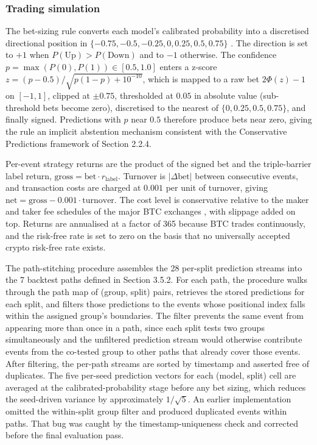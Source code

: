 \documentclass[12pt,a4paper,oneside]{article}
\begin{document}
\subsubsection{Trading simulation}\label{subsubsec:trading_simulation}

The bet-sizing rule converts each model's calibrated probability into a discretised directional position in $\{-0.75, -0.5, -0.25, 0, 0.25, 0.5, 0.75\}$ \citep[Chapter 10]{lopez_de_prado_2018}. The direction is set to $+1$ when $P(\text{Up}) > P(\text{Down})$ and to $-1$ otherwise. The confidence $p = \max(P(0), P(1)) \in [0.5, 1.0]$ enters a z-score $z = (p - 0.5) / \sqrt{p(1 - p) + 10^{-10}}$, which is mapped to a raw bet $2\Phi(z) - 1$ on $[-1, 1]$, clipped at $\pm 0.75$, thresholded at $0.05$ in absolute value (sub-threshold bets become zero), discretised to the nearest of $\{0, 0.25, 0.5, 0.75\}$, and finally signed. Predictions with $p$ near $0.5$ therefore produce bets near zero, giving the rule an implicit abstention mechanism consistent with the Conservative Predictions framework of Section 2.2.4.

Per-event strategy returns are the product of the signed bet and the triple-barrier label return, $\text{gross} = \text{bet} \cdot r_{\text{label}}$. Turnover is $|\Delta \text{bet}|$ between consecutive events, and transaction costs are charged at $0.001$ per unit of turnover, giving $\text{net} = \text{gross} - 0.001 \cdot \text{turnover}$. The cost level is conservative relative to the maker and taker fee schedules of the major BTC exchanges \citep{nabar_shroff_2023}, with slippage added on top. Returns are annualised at a factor of 365 because BTC trades continuously, and the risk-free rate is set to zero on the basis that no universally accepted crypto risk-free rate exists.

The path-stitching procedure assembles the 28 per-split prediction streams into the 7 backtest paths defined in Section 3.5.2. For each path, the procedure walks through the path map of (group, split) pairs, retrieves the stored predictions for each split, and filters those predictions to the events whose positional index falls within the assigned group's boundaries. The filter prevents the same event from appearing more than once in a path, since each split tests two groups simultaneously and the unfiltered prediction stream would otherwise contribute events from the co-tested group to other paths that already cover those events. After filtering, the per-path streams are sorted by timestamp and asserted free of duplicates. The five per-seed prediction vectors for each (model, split) cell are averaged at the calibrated-probability stage before any bet sizing, which reduces the seed-driven variance by approximately $1/\sqrt{5}$. An earlier implementation omitted the within-split group filter and produced duplicated events within paths. That bug was caught by the timestamp-uniqueness check and corrected before the final evaluation pass.
\end{document}
